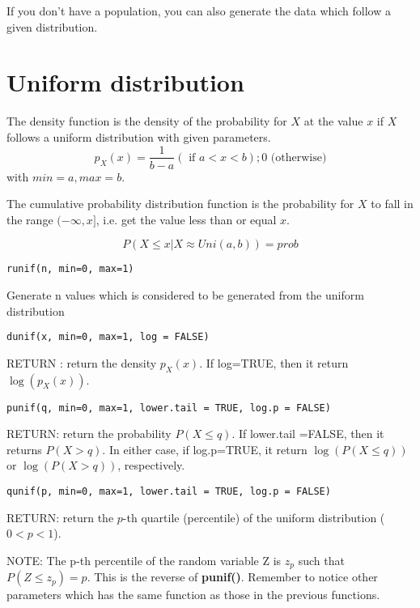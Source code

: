 If you don't have a population, you can also generate the data which
follow a given distribution.

\section{Uniform distribution}
\label{sec:uniform-distribution}
The density function is the density of the probability for $X$ at the
value $x$ if $X$ follows a uniform distribution with given parameters.
\begin{equation}
  \label{eq:1}
  p_X(x) = \frac{1}{b-a} (\text{ if } a<x<b); 0 \text{ (otherwise)}
\end{equation}
with $min=a, max=b$.

The cumulative probability distribution function is the probability
for $X$ to fall in the range $(-\infty,x]$, i.e. get the value less
than or equal $x$.

\begin{equation}
  \label{eq:4}
  P(X\le x|X \approx Uni(a,b)) = prob
\end{equation}

\begin{verbatim}
runif(n, min=0, max=1)
\end{verbatim}
Generate n values which is considered to be generated from the uniform
distribution

\begin{verbatim}
dunif(x, min=0, max=1, log = FALSE)
\end{verbatim}
RETURN : return the density $p_X(x)$. If log=TRUE, then it return $\log(p_X(x))$.

\begin{verbatim}
punif(q, min=0, max=1, lower.tail = TRUE, log.p = FALSE)
\end{verbatim}
RETURN: return the probability $P(X \le q)$. If lower.tail =FALSE,
then it returns $P(X>q)$. In either case, if log.p=TRUE, it return
$\log(P(X\le q))$ or $\log(P(X>q))$, respectively.

\begin{verbatim}
qunif(p, min=0, max=1, lower.tail = TRUE, log.p = FALSE)
\end{verbatim}
RETURN: return the  $p$-th quartile (percentile) of the uniform
distribution ($0<p<1$).

NOTE: The p-th percentile of the random variable Z is $z_p$ such that
$P(Z \le z_p) = p$. This is the reverse of {\bf punif()}. Remember to
notice other parameters which has the same function as those in the
previous functions.

